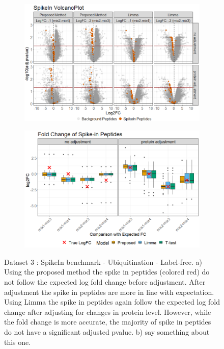 \documentclass[mcp]{article}
\numberwithin{table}{section}
\begin{document}
\begin{figure}[ht]
\centering
\begin{subfigure}[c]{0.825\linewidth}
\includegraphics[width=1\textwidth]{images/spike_in_volcano.png}
\caption{}
\label{fig:spikein_prop_volcano}
\end{subfigure}
\begin{subfigure}[c]{0.825\linewidth}
\includegraphics[width=1\textwidth]{images/spike_in_fc.png}
\caption{}
\label{fig:spikein_limma_volcano}
\end{subfigure}
\caption{Dataset 3 : SpikeIn benchmark - Ubiquitination - Label-free. a) Using the proposed method the spike in peptides (colored red) do not follow the expected log fold change before adjustment. After adjustment the spike in peptides are more in line with expectation. Using Limma the spike in peptides again follow the expected log fold change after adjusting for changes in protein level. However, while the fold change is more accurate, the majority of spike in peptides do not have a significant adjusted pvalue. b) say something about this one.}
\label{fig:spikein_volcano}
\end{figure}
\end{document}
